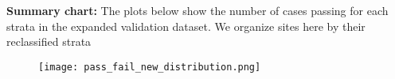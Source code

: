 \documentclass[8pt]{beamer}
\begin{document}
  \begin{frame}
    \textbf{Summary chart:}
    The plots below show the number of cases passing for each strata in the expanded validation dataset. We organize sites here by their reclassified strata
    \vfill
    \begin{figure}
      \hspace*{-1cm}   
    \texttt{[image: pass\_fail\_new\_distribution.png]}
    \end{figure}
  \end{frame}

\end{document}
